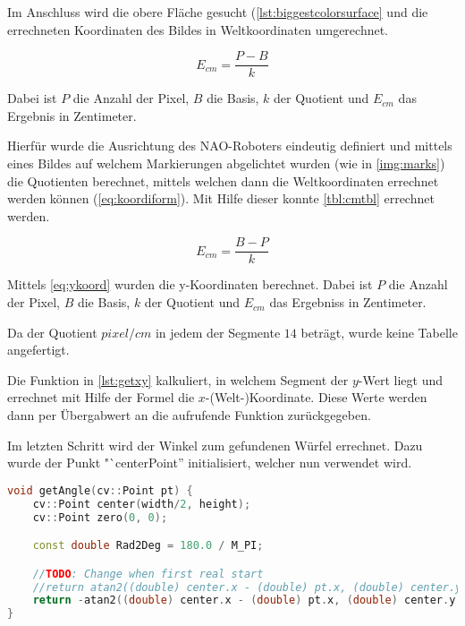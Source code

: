         Im Anschluss wird die obere Fläche gesucht
        (\autoref{lst:biggestcolorsurface} und die errechneten Koordinaten des
        Bildes in Weltkoordinaten umgerechnet.

        \begin{equation} \label{eq:koordiform}
            E_{cm} = \frac{P - B}{k}
        \end{equation}

        Dabei ist $P$ die Anzahl der Pixel, $B$ die Basis, $k$ der Quotient und
        $E_{cm}$ das Ergebnis in Zentimeter.

        Hierfür wurde die Ausrichtung des NAO-Roboters eindeutig definiert und
        mittels eines Bildes auf welchem Markierungen abgelichtet wurden
        (wie in \autoref{img:marks})
        die Quotienten berechnet, mittels welchen dann die Weltkoordinaten
        errechnet werden können (\ref{eq:koordiform}).
        Mit Hilfe dieser konnte \autoref{tbl:cmtbl} errechnet werden.

        \begin{equation} \label{eq:ykoord}
            E_{cm} = \frac{B - P}{k}
        \end{equation}

        Mittels \ref{eq:ykoord} wurden die y-Koordinaten berechnet.
        Dabei ist $P$ die Anzahl der Pixel, $B$ die Basis, $k$ der Quotient und
        $E_{cm}$ das Ergebniss in Zentimeter.

        Da der Quotient $pixel / cm$ in jedem der Segmente $14$ beträgt, wurde
        keine Tabelle angefertigt.

        Die Funktion in \autoref{lst:getxy} kalkuliert, in welchem Segment der
        $y$-Wert liegt und errechnet mit Hilfe der Formel die
        $x$-(Welt-)Koordinate.
        Diese Werte werden dann per Übergabwert an die aufrufende Funktion
        zurückgegeben.

        Im letzten Schritt wird der Winkel zum gefundenen Würfel errechnet.
        Dazu wurde der Punkt "`centerPoint'' initialisiert, welcher nun
        verwendet wird.

\begin{lstlisting}[language=c++,
                   caption={Funktion: "`getAngle''},
                   label={lst:getAngle}]
void getAngle(cv::Point pt) {
    cv::Point center(width/2, height);
    cv::Point zero(0, 0);

    const double Rad2Deg = 180.0 / M_PI;

    //TODO: Change when first real start
    //return atan2((double) center.x - (double) pt.x, (double) center.y - (double) pt.y) * Rad2Deg; //degree
    return -atan2((double) center.x - (double) pt.x, (double) center.y - (double)pt.y); //rad
}
\end{lstlisting}

